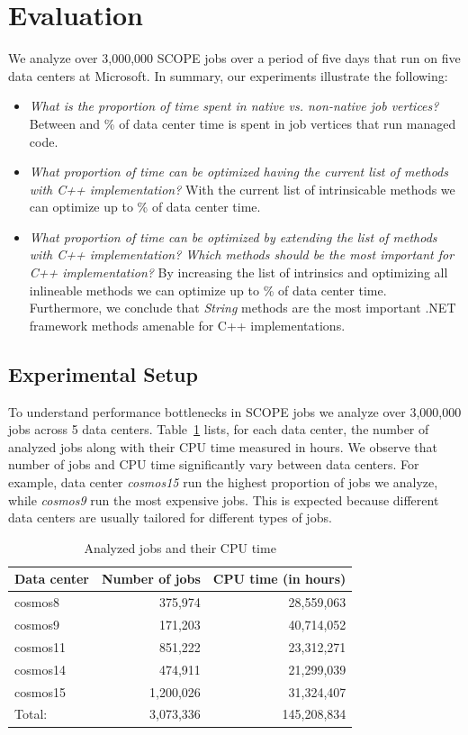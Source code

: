 \section{Evaluation}
We analyze over 3,000,000 SCOPE jobs over a period of five days that run on five data centers at Microsoft. 
In summary, our experiments illustrate the following:

\begin{itemize}
\item \emph{What is the proportion of time spent in native vs. non-native job vertices?}
Between \nonNativeTimeL{} and \nonNativeTimeU \% of data center time is spent in job vertices that run managed code.

\item \emph{What proportion of time can be optimized having the current list of methods with C++ implementation?} 
With the current list of intrinsicable methods we can optimize up to \optimizableU{} \% of data center time.

\item \emph{What proportion of time can be optimized by extending the list of methods with C++ implementation? 
Which methods should be the most important for C++ implementation?}
By increasing the list of intrinsics and optimizing all inlineable methods we can optimize up to \potentiallyOptimizableU{} \% of data center time. 
Furthermore, we conclude that \emph{String} methods are the most important .NET framework methods amenable for C++ implementations.


\end{itemize}

\subsection{Experimental Setup}
To understand performance bottlenecks in SCOPE jobs we analyze over 3,000,000 jobs across 5 data centers.
Table~\ref{tb:projects} lists, for each data center, the number of analyzed jobs along with their CPU time measured in hours.
We observe that number of jobs and CPU time significantly vary between data centers. 
For example, data center \emph{cosmos15} run the highest proportion of jobs we analyze, while \emph{cosmos9} run the most expensive jobs. 
This is expected because different data centers are usually tailored for different types of jobs. 


\begin{table}[ht]
\centering
\begin{tabular}{lrr}
  Data center & Number of jobs & CPU time (in hours) \\
 \midrule
cosmos8 & 375,974 & 28,559,063 \\
cosmos9 & 171,203 & 40,714,052 \\
cosmos11 & 851,222 & 23,312,271\\
cosmos14 & 474,911 & 21,299,039\\
cosmos15 & 1,200,026 & 31,324,407 \\
\midrule
Total: & 3,073,336 & 145,208,834\\
\midrule
\end{tabular}
 \caption{Analyzed jobs and their CPU time
\label{tb:projects}}
\end{table}

